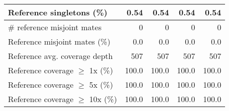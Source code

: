 \documentclass[12pt,a4paper]{article}
\begin{document}
\begin{table}[ht]
\begin{center}
\begin{tabular}{|l*{4}{|r}|}
Reference singletons (\%) & 0.54 & 0.54 & 0.54 & 0.54 \\ \hline
\# reference misjoint mates & 0 & 0 & 0 & 0 \\ \hline
Reference misjoint mates (\%) & 0.0 & 0.0 & 0.0 & 0.0 \\ \hline
Reference avg. coverage depth & 507 & 507 & 507 & 507 \\ \hline
Reference coverage $\geq$ 1x (\%) & 100.0 & 100.0 & 100.0 & 100.0 \\ \hline
Reference coverage $\geq$ 5x (\%) & 100.0 & 100.0 & 100.0 & 100.0 \\ \hline
Reference coverage $\geq$ 10x (\%) & 100.0 & 100.0 & 100.0 & 100.0 \\ \hline
\end{tabular}
\end{center}
\end{table}
\end{document}
